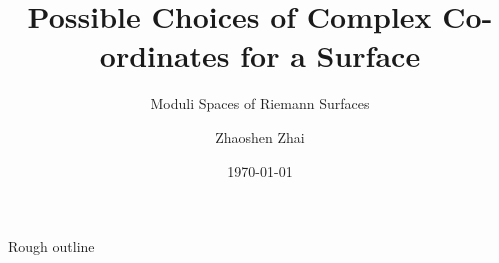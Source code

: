 \documentclass{beamer}
\title{\normalsize Possible Choices of Complex Co-ordinates for a Surface}
\subtitle{\small Moduli Spaces of Riemann Surfaces}
\author{Zhaoshen Zhai}
\institute{McGill University}
\date{\today}
\begin{document}
    \frame{\titlepage}
    \begin{frame}{Rough outline}

    \end{frame}
\end{document}
